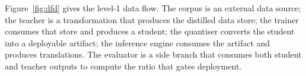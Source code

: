 \enlargethispage{\baselineskip}
Figure~\ref{fig:dfd} gives the level-1 data flow. The corpus is an external
data source; the teacher is a transformation that produces the distilled data
store; the trainer consumes that store and produces a student; the quantiser
converts the student into a deployable artifact; the inference engine consumes
the artifact and produces translations. The evaluator is a side branch that
consumes both student and teacher outputs to compute the ratio that gates
deployment.

